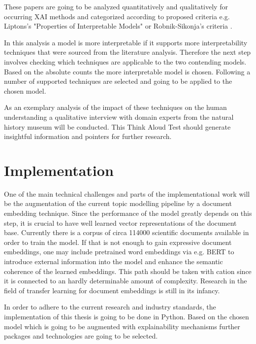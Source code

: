 \documentclass[pdftex,a4paper,12pt]{scrartcl}
\begin{document}
These papers are going to be analyzed quantitatively and qualitatively for occurring XAI methods and categorized according to proposed criteria e.g. Liptons's "Properties of Interpretable Models" \cite{liptonMythosModelInterpretability2016} or Robnik-Sikonja's criteria \cite{robnik-sikonjaPerturbationBasedExplanationsPrediction2018}.

In this analysis a model is more interpretable if it supports more interpretability techniques that were sourced from the literature analysis. Therefore the next step involves checking which techniques are applicable to the two contending models. Based on the absolute counts the more interpretable model is chosen. Following a number of supported techniques are selected and going to be applied to the chosen model.

As an exemplary analysis of the impact of these techniques on the human understanding a qualitative interview with domain experts from the natural history museum will be conducted. This Think Aloud Test should generate insightful information and pointers for further research.



\section{Implementation}

One of the main technical challenges and parts of the implementational work will be the augmentation of the current topic modelling pipeline by a document embedding technique. Since the performance of the model greatly depends on this step, it is crucial to have well learned vector representations of the document base. Currently there is a corpus of circa 114000 scientific documents available in order to train the model. If that is not enough to gain expressive document embeddings, one may include pretrained word embeddings via e.g. BERT \cite{devlinBERTPretrainingDeep2018} to introduce external information into the model and enhance the semantic coherence of the learned embeddings. This path should be taken with cation since it is connected to an hardly determinable amount of complexity. Research in the field of transfer learning for document embeddings is still in its infancy.

In order to adhere to the current research and industry standards, the implementation of this thesis is going to be done in Python. Based on the chosen model which is going to be augmented with explainability mechanisms further packages and technologies are going to be selected.
\end{document}
